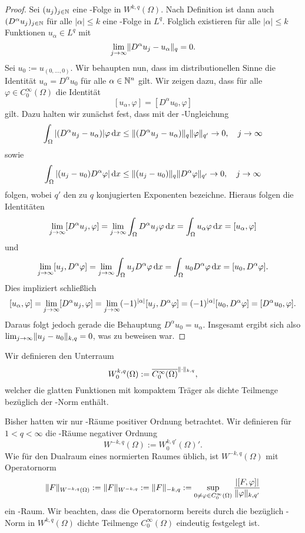 \begin{proof}
  Sei $(u_j)_{j \in \mathbb{N}}$ eine \cauchy\hyp{}Folge in $W^{k,q}(\Omega)$.
  Nach Definition ist dann auch $(D^\alpha u_j)_{j \in \mathbb{N}}$ für alle $|\alpha| \leq k$ eine \cauchy\hyp{}Folge in $L^q$.
  Folglich existieren für alle $|\alpha| \leq k$ Funktionen $u_\alpha \in L^q$ mit 
  $$
  \lim_{j \to \infty} \lVert D^\alpha u_j - u_\alpha \rVert_q = 0.
  $$
  Sei $u_0 := u_{(0,\dots,0)}$.
  Wir behaupten nun, dass im distributionellen Sinne die Identität $u_\alpha = D^\alpha u_0$ für alle $\alpha \in \mathbb{N}^n$ gilt.
  Wir zeigen dazu, dass für alle $\varphi \in C_0^\infty(\Omega)$ die Identität
  $$
  [u_\alpha, \varphi] = [D^\alpha u_0, \varphi]
  $$
  gilt.
  Dazu halten wir zunächst fest, dass mit der \hoelder\hyp{}Ungleichung
  $$
  \int_\Omega |(D^\alpha u_j - u_\alpha)| \varphi \, {\operatorname{d}\!{x}}
  \leq \lVert (D^\alpha u_j - u_\alpha) \rVert_q \lVert \varphi \rVert_{q'} \to 0, \quad j \to \infty
  $$
  sowie
  $$
  \int_\Omega |(u_j - u_0) D^\alpha \varphi| \, {\operatorname{d}\!{x}}
  \leq \lVert (u_j - u_0) \rVert_q \lVert D^\alpha \varphi \rVert_{q'} \to 0, \quad j \to \infty
  $$
  folgen, wobei $q'$ den zu $q$ konjugierten Exponenten bezeichne.
  Hieraus folgen die Identitäten
  $$
  \lim_{j \to \infty} [D^\alpha u_j, \varphi] = \lim_{j \to \infty} \int_\Omega D^\alpha u_j \varphi \, {\operatorname{d}\!{x}} =  \int_\Omega u_\alpha \varphi \, {\operatorname{d}\!{x}} =  [u_\alpha, \varphi] 
  $$
  und
  $$
    \lim_{j \to \infty} [u_j, D^\alpha\varphi] = \lim_{j \to \infty} \int_\Omega u_j D^\alpha\varphi \, {\operatorname{d}\!{x}} =  \int_\Omega u_0 D^\alpha \varphi \, {\operatorname{d}\!{x}} = [u_0, D^\alpha \varphi].
  $$
  Dies impliziert schließlich
  $$ 
  [u_\alpha, \varphi] 
  = \lim_{j \to \infty} [D^\alpha u_j, \varphi] \\
  = \lim_{j \to \infty} (-1)^{|\alpha|}[u_j, D^\alpha \varphi] \\
  =  (-1)^{|\alpha|}[u_0, D^\alpha \varphi]
  = [D^\alpha u_0, \varphi].
  $$
  Daraus folgt jedoch gerade die Behauptung $D^\alpha u_0 = u_\alpha$.
  Insgesamt ergibt sich also $\lim_{j \to \infty} \lVert u_j - u_0 \rVert_{k,q} =  0$, was zu beweisen war.
\end{proof}

Wir definieren den Unterraum
$$
  W_0^{k,q}(\Omega) := \overline{C_0^\infty(\Omega)}^{\lVert \cdot \rVert_{k,q}},
$$
welcher die glatten Funktionen mit kompaktem Träger als dichte Teilmenge bezüglich der \sobolev\hyp{}Norm enthält.

Bisher hatten wir nur \sobolev\hyp{}Räume positiver Ordnung betrachtet.
Wir definieren für $1 < q < \infty$ die \sobolev\hyp{}Räume negativer Ordnung 
$$
  W^{-k,q}(\Omega) := W_0^{k,q'}(\Omega)'.
$$
Wie für den Dualraum eines normierten Raumes üblich, ist $W^{-k,q}(\Omega)$ mit Operatornorm 
$$
\lVert F \rVert_{W^{-k,q}(\Omega)} := \lVert F \rVert_{W^{-k,q}} := \lVert F \rVert_{-k,q} := \sup_{0 \neq \varphi \in C_0^\infty(\Omega)} \frac{|[F,\varphi]|}{\lVert \varphi \rVert_{k,q'}}
$$
ein \banach\hyp{}Raum.
Wir beachten, dass die Operatornorm bereits durch die bezüglich \sobolev\hyp{}Norm in $W^{k,q}(\Omega)$ dichte Teilmenge $C_0^\infty(\Omega)$ eindeutig festgelegt ist.

